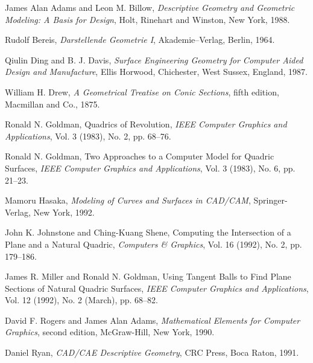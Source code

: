 \newpage
\begin{thebibliography}{999}

     James Alan Adams and Leon M. Billow,
     {\em Descriptive Geometry and Geometric Modeling: A Basis for Design},
     Holt, Rinehart and Winston, New York, 1988.

     Rudolf Bereis,
     {\em Darstellende Geometrie I},
     Akademie--Verlag, Berlin, 1964.

     Qiulin Ding and B. J. Davis,
     {\em Surface Engineering Geometry for Computer Aided Design and
          Manufacture},
     Ellis Horwood, Chichester, West Sussex, England, 1987.

     William H. Drew,
     {\em A Geometrical Treatise on Conic Sections},
     fifth edition,
     Macmillan and Co., 1875.

     Ronald N. Goldman,
     Quadrics of Revolution,
     {\em IEEE Computer Graphics and Applications},
     Vol. 3 (1983), No. 2, pp. 68--76.

     Ronald N. Goldman,
     Two Approaches to a Computer Model for Quadric Surfaces,
     {\em IEEE Computer Graphics and Applications},
     Vol. 3 (1983), No. 6, pp. 21--23.

     Mamoru Hasaka,
     {\em Modeling of Curves and Surfaces in CAD/CAM},
     Springer-Verlag, New York, 1992.

     John K. Johnstone and Ching-Kuang Shene,
     Computing the Intersection of a Plane and a Natural Quadric,
     {\em Computers \& Graphics},
     Vol. 16 (1992), No. 2, pp. 179--186.


     James R. Miller and Ronald N. Goldman,
     Using Tangent Balls to Find Plane Sections of Natural Quadric Surfaces,
     {\em IEEE Computer Graphics and Applications},
     Vol. 12 (1992), No. 2 (March), pp. 68--82.

     David F. Rogers and James Alan Adams,
     {\em Mathematical Elements for Computer Graphics},
     second edition,
     McGraw-Hill, New York, 1990.

     Daniel Ryan,
     {\em CAD/CAE Descriptive Geometry},
     CRC Press, Boca Raton, 1991.


\end{thebibliography}
